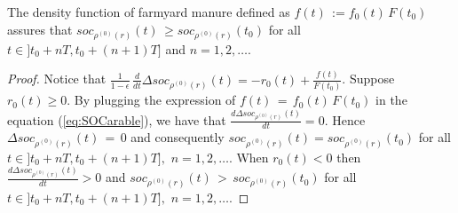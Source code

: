 \begin{theorem}\label{thm:fdit}
The density function of farmyard manure defined as $f(t)\,:=f_0(t)\, F(t_0)$
assures that  $soc_{\rho^{(0)}(r)}(t)\, \geq soc_{\rho^{(0)}(r)} (t_0)$ for all $t\in ]t_0+nT,t_0+(n+1)T]$ and $n=1,2,\dots.$
\end{theorem}
\begin{proof}
Notice that $\frac{1}{1-\epsilon}\,\frac{d}{dt}\Delta soc_{\rho^{(0)}(r)}(t)=-r_0(t)+\frac{f(t)}{F(t_0)}$.
Suppose $r_0(t) \geq 0$. By plugging the expression of $f(t)\, =\, f_0(t)\,  F(t_0)$ in the equation (\ref{eq:SOCarable}), we have that $\displaystyle \frac{d \Delta soc_{\rho^{(0)}(r)}(t)}{dt}   =   0$. Hence  $\Delta soc_{\rho^{(0)}(r)}(t)\, =\,0$ and consequently  $soc_{\rho^{(0)}(r)}(t)=soc_{\rho^{(0)}(r)} (t_0)$ for all $t\in ]t_0+nT,t_0+(n+1)T],\,\, n=1,2,\dots.$ When $r_0(t) < 0$ then $\displaystyle \frac{d \Delta soc_{\rho^{(0)}(r)}(t)}{dt} > 0$ and $soc_{\rho^{(0)}(r)}(t)\, >\, soc_{\rho^{(0)}(r)} (t_0)$ for all $t\in ]t_0+nT,t_0+(n+1)T],\,\, n=1,2,\dots.$
\end{proof}

